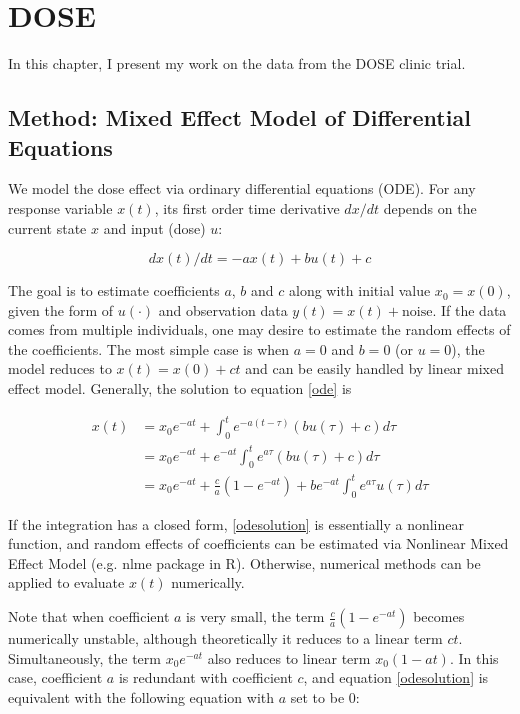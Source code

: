 \chapter{DOSE}
\label{dosechapter}

In this chapter, I present my work on the data from the DOSE clinic trial.

\section{Method: Mixed Effect Model of Differential Equations}

We model the dose effect via ordinary differential equations (ODE). For any response variable $x(t)$, its first order time derivative $dx/dt$ depends on the current state $x$ and input (dose) $u$:

\begin{equation}
\label{ode}
dx(t)/dt = -ax(t) + bu(t) + c
\end{equation}

The goal is to estimate coefficients $a$, $b$ and $c$ along with initial value $x_0=x(0)$, given the form of $u(\cdot)$ and observation data $y(t) = x(t) + \text{noise}$. If the data comes from multiple individuals, one may desire to estimate the random effects of the coefficients. The most simple case is when $a=0$ and $b=0$ (or $u=0$), the model reduces to $x(t) = x(0) + ct$ and can be easily handled by linear mixed effect model. Generally, the solution to equation \ref{ode} is 

\begin{equation}
\label{odesolution}
	\begin{split}
		x(t) &= x_0 e^{-at} + \int_0^t e^{-a(t-\tau)} (bu(\tau) + c) d\tau \\
		     &= x_0 e^{-at} + e^{-at}\int_0^t e^{a\tau} (bu(\tau) + c) d\tau\\
		     &= x_0 e^{-at} + \frac{c}{a}(1-e^{-at}) + b e^{-at}\int_0^t e^{a\tau} u(\tau) d\tau
	\end{split}
\end{equation}

If the integration has a closed form, \ref{odesolution} is essentially a nonlinear function, and random effects of coefficients can be estimated via Nonlinear Mixed Effect Model (e.g. \textsf{nlme} package in R). Otherwise, numerical methods can be applied to evaluate $x(t)$ numerically.

Note that when coefficient $a$ is very small, the term $\frac{c}{a}(1-e^{-at})$ becomes numerically unstable, although theoretically it reduces to a linear term $ct$. Simultaneously, the term $x_0e^{-at}$ also reduces to linear term $x_0(1-at)$. In this case, coefficient $a$ is redundant with coefficient $c$, and equation \ref{odesolution} is equivalent with the following equation with $a$ set to be 0:

